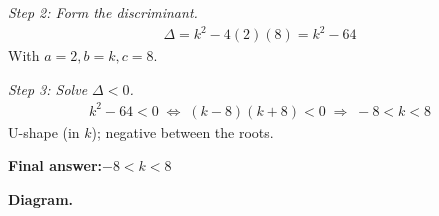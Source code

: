 \documentclass[11pt]{article}
\begin{document}
\textit{Step 2: Form the discriminant.}
\[\begin{gathered}
\Delta = k^2 - 4(2)(8) = k^2 - 64
\end{gathered}\]
With \( a = 2, b = k, c = 8 \).

\textit{Step 3: Solve \( \Delta < 0 \).}
\[\begin{gathered}
k^2 - 64 < 0 \;\Longleftrightarrow\; (k - 8)(k + 8) < 0 \;\Longrightarrow\; -8 < k < 8
\end{gathered}\]
U-shape (in \( k \)); negative between the roots.

\begin{answerbox}
\textbf{Final answer:}\quad \(\displaystyle -8 < k < 8\)
\end{answerbox}
\textbf{Diagram.}

\begin{center}
\end{center}
\end{document}
